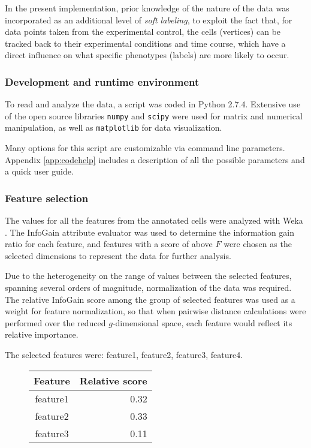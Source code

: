 \documentclass[oneside, a4paper, draft]{memoir} %
\begin{document}
In the present implementation, prior knowledge of the nature of the data was incorporated as an additional level of
\emph{soft labeling}, to exploit the fact that, for data points taken from the experimental control, the cells
(vertices) can be tracked back to their experimental conditions and time course, which have a direct influence on what
specific phenotypes (labels) are more likely to occur.

\subsubsection{Development and runtime environment}
To read and analyze the data, a script was coded in Python 2.7.4. Extensive use of the open source libraries
\texttt{numpy} and \texttt{scipy} were used for matrix and numerical manipulation, as well as \texttt{matplotlib} for
data visualization.

Many options for this script are customizable via command line parameters. Appendix \ref{app:codehelp} includes a
description of all the possible parameters and a quick user guide.

\subsubsection{Feature selection}
The values for all the features from the annotated cells were analyzed with Weka \cite{hall2009weka}. The InfoGain
attribute evaluator was used to determine the information gain ratio for each feature, and features with a score of
 above $F$ were chosen as the selected dimensions to represent the data for further analysis.

Due to the heterogeneity on the range of values between the selected features, spanning 
several orders of magnitude, normalization of the data was required. The relative InfoGain score among the group of
selected features was used as a weight for feature normalization, so that when pairwise distance calculations were 
performed over the reduced $g$-dimensional space, each feature would reflect its
relative importance.

The selected features were:  feature1, feature2, feature3, feature4. 

\begin{figure}[here]
\centering
\begin{tabular}{cr}
	Feature & Relative score\\
	\hline
	feature1 & 0.32\\
	feature2 & 0.33\\
	feature3 & 0.11
\end{tabular}
\end{figure}
\end{document}
